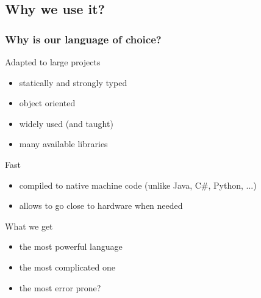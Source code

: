 \subsection[Use]{Why we use it?}

\begin{frame}
  \frametitle{Why is \cpp{} our language of choice?}
  \begin{block}{Adapted to large projects}
    \begin{itemize}
    \item statically and strongly typed
    \item object oriented
    \item widely used (and taught)
    \item many available libraries
    \end{itemize}
  \end{block}
  \pause
  \begin{block}{Fast}
    \begin{itemize}
    \item compiled to native machine code (unlike Java, C\#, Python, ...)
    \item allows to go close to hardware when needed
    \end{itemize}
  \end{block}
  \pause
  \begin{alertblock}{What we get}
    \begin{itemize}
    \item the most powerful language
    \item the most complicated one
    \item the most error prone?
    \end{itemize}
  \end{alertblock}
\end{frame}
